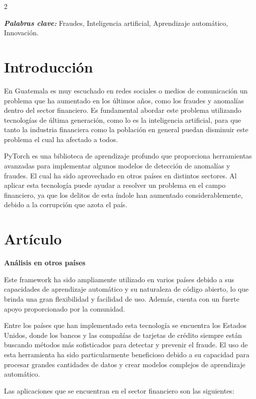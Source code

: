 \documentclass[12pt,spanish,Letterpaper,openany]{book}
\begin{document}
\begin {multicols}{2}

\textbf{\emph{Palabras clave:}} Fraudes, Inteligencia artificial, Aprendizaje automático, Innovación.

\hypertarget{introducciuxf3n-3}{%
\section{Introducción}\label{introducciuxf3n-3}}

En Guatemala es muy escuchado en redes sociales o medios de comunicación un problema que ha aumentado en los últimos años, como los fraudes y anomalías dentro del sector financiero. Es fundamental abordar este problema utilizando tecnologías de última generación, como lo es la inteligencia artificial, para que tanto la industria financiera como la
población en general puedan disminuir este problema el cual ha afectado a todos.

PyTorch es una biblioteca de aprendizaje profundo que proporciona herramientas avanzadas para implementar algunos modelos de detección de anomalías y fraudes. El cual ha sido aprovechado en otros países en distintos sectores. Al aplicar esta tecnología puede ayudar a resolver un problema en el campo financiero, ya que los delitos de esta índole han aumentado considerablemente, debido a la corrupción que azota el país.

\hypertarget{artuxedculo-3}{%
\section{Artículo}\label{artuxedculo-3}}

\textbf{Análisis en otros países}

Este framework ha sido ampliamente utilizado en varios países debido a sus capacidades de aprendizaje automático y su naturaleza de código abierto, lo que brinda una gran flexibilidad y facilidad de uso. Además, cuenta con un fuerte apoyo proporcionado por la comunidad.

Entre los países que han implementado esta tecnología se encuentra los Estados Unidos, donde los bancos y las compañías de tarjetas de crédito siempre están buscando métodos más sofisticados para detectar y prevenir el fraude. El uso de esta herramienta ha sido particularmente beneficioso debido a su capacidad para procesar grandes cantidades de datos
y crear modelos complejos de aprendizaje automático.

Las aplicaciones que se encuentran en el sector financiero son las siguientes:


\end{multicols}
\end{document}
